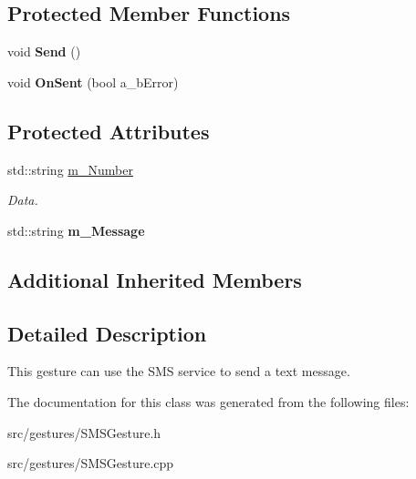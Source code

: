 \subsection*{Protected Member Functions}
\begin{DoxyCompactItemize}
\item 
\mbox{\label{class_s_m_s_gesture_a94a668bc302f9657f9bd00b9312006ef}} 
void {\bfseries Send} ()
\item 
\mbox{\label{class_s_m_s_gesture_a4d913d652d256e097a1225345ebdf7c6}} 
void {\bfseries On\+Sent} (bool a\+\_\+b\+Error)
\end{DoxyCompactItemize}
\subsection*{Protected Attributes}
\begin{DoxyCompactItemize}
\item 
\mbox{\label{class_s_m_s_gesture_a77f15eec10b4a3cf49398b627fb1f764}} 
std\+::string \hyperlink{class_s_m_s_gesture_a77f15eec10b4a3cf49398b627fb1f764}{m\+\_\+\+Number}
\begin{DoxyCompactList}\small\item\em Data. \end{DoxyCompactList}\item 
\mbox{\label{class_s_m_s_gesture_acc475543c2d0f0ba389cbd7f237b08fa}} 
std\+::string {\bfseries m\+\_\+\+Message}
\end{DoxyCompactItemize}
\subsection*{Additional Inherited Members}


\subsection{Detailed Description}
This gesture can use the S\+MS service to send a text message. 

The documentation for this class was generated from the following files\+:\begin{DoxyCompactItemize}
\item 
src/gestures/S\+M\+S\+Gesture.\+h\item 
src/gestures/S\+M\+S\+Gesture.\+cpp\end{DoxyCompactItemize}
